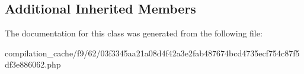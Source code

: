 \subsection*{Additional Inherited Members}


The documentation for this class was generated from the following file\+:\begin{DoxyCompactItemize}
\item 
compilation\+\_\+cache/f9/62/03f3345aa21a08d4f42a3e2fab487674bcd4735ecf754c87f5df3e886062.\+php\end{DoxyCompactItemize}
